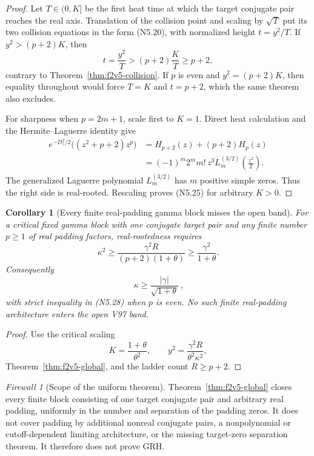 \documentclass[11pt]{article}
\newtheorem{corollary}[theorem]{Corollary}
\theoremstyle{definition}
\theoremstyle{remark}
\newtheorem{firewall}[theorem]{Firewall}
\begin{document}
\begin{proof}
Let \(T\in(0,K]\) be the first heat time at which the target conjugate pair
reaches the real axis.  Translation of the collision point and scaling by
\(\sqrt T\) put its two collision equations in the form
\textup{(N5.20)}, with normalized height \(t=y^2/T\).  If
\(y^2>(p+2)K\), then
\[
 t=\frac{y^2}{T}>(p+2)\frac KT\ge p+2,
 \tag{N5.26}
\]
contrary to Theorem~\ref{thm:f2v5-collision}.  If \(p\) is even and
\(y^2=(p+2)K\), then equality throughout would force \(T=K\) and
\(t=p+2\), which the same theorem also excludes.

For sharpness when \(p=2m+1\), scale first to \(K=1\).  Direct heat
calculation and the Hermite--Laguerre identity give
\[
\begin{aligned}
 e^{-D_z^2/2}\bigl((z^2+p+2)z^p\bigr)
 &=H_{p+2}(z)+(p+2)H_p(z)\\
 &=(-1)^m2^m m!\,z^3
 L_m^{(3/2)}\left(\frac{z^2}{2}\right).
\end{aligned}
\tag{N5.27}
\]
The generalized Laguerre polynomial \(L_m^{(3/2)}\) has \(m\) positive
simple zeros.  Thus the right side is real-rooted.  Rescaling proves
\textup{(N5.25)} for arbitrary \(K>0\).
\end{proof}

\begin{corollary}[Every finite real-padding gamma block misses the open band]
\label{cor:f2v5-gamma}
For a critical fixed gamma block with one conjugate target pair and any
finite number \(p\ge1\) of real padding factors, real-rootedness requires
\[
 \kappa^2\ge
 \frac{\gamma^2R}{(p+2)(1+\theta)}
 \ge\frac{\gamma^2}{1+\theta}.
 \tag{N5.28}
\]
Consequently
\[
 \boxed{\ \kappa\ge\frac{|\gamma|}{\sqrt{1+\theta}}\ },
 \tag{N5.29}
\]
with strict inequality in \textup{(N5.28)} when \(p\) is even.  No such
finite real-padding architecture enters the open V97 band.
\end{corollary}

\begin{proof}
Use the critical scaling
\[
 K=\frac{1+\theta}{\theta^2},\qquad
 y^2=\frac{\gamma^2R}{\theta^2\kappa^2},
 \tag{N5.30}
\]
Theorem~\ref{thm:f2v5-global}, and the ladder count \(R\ge p+2\).
\end{proof}

\begin{firewall}[Scope of the uniform theorem]
Theorem~\ref{thm:f2v5-global} closes every finite block consisting of one
target conjugate pair and arbitrary real padding, uniformly in the number
and separation of the padding zeros.  It does not cover padding by additional
nonreal conjugate pairs, a nonpolynomial or cutoff-dependent limiting
architecture, or the missing target-zero separation theorem.  It therefore
does not prove GRH.
\end{firewall}
\end{document}
